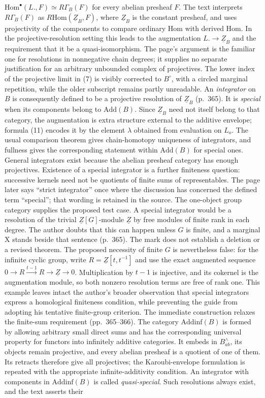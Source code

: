 \documentclass[10pt,oneside]{book}
\begin{document}
$\mathrm{Hom}^{\bullet}(L.,F)\simeq R\Gamma_B(F)$ for every abelian presheaf $F$. The text interprets $R\Gamma_B(F)$ as $R\mathrm{Hom}(\underline Z_B,F)$, where $\underline Z_B$ is the constant presheaf, and uses projectivity of the components to compare ordinary Hom with derived Hom. In the projective-resolution setting this leads to the augmentation $L.\to\underline Z_B$ and the requirement that it be a quasi-isomorphism. The page's argument is the familiar one for resolutions in nonnegative chain degrees; it supplies no separate justification for an arbitrary unbounded complex of projectives. The lower index of the projective limit in (7) is visibly corrected to $B^{\circ}$, with a circled marginal repetition, while the older subscript remains partly unreadable. An \emph{integrator} on $B$ is consequently defined to be a projective resolution of $\underline Z_B$ (p.~365). It is \emph{special} when its components belong to $\mathrm{Add}(B)$. Since $\underline Z_B$ need not itself belong to that category, the augmentation is extra structure external to the additive envelope; formula (11) encodes it by the element $\lambda$ obtained from evaluation on $L_o$. The usual comparison theorem gives chain-homotopy uniqueness of integrators, and fullness gives the corresponding statement within $\mathrm{Add}(B)$ for special ones. General integrators exist because the abelian presheaf category has enough projectives. Existence of a special integrator is a further finiteness question: successive kernels need not be quotients of finite sums of representables. The page later says ``strict integrator'' once where the discussion has concerned the defined term ``special''; that wording is retained in the source. The one-object group category supplies the proposed test case. A special integrator would be a resolution of the trivial $\underline Z[G]$-module $\underline Z$ by free modules of finite rank in each degree. The author doubts that this can happen unless $G$ is finite, and a marginal X stands beside that sentence (p.~365). The mark does not establish a deletion or a revised theorem. The proposed necessity of finite $G$ is nevertheless false: for the infinite cyclic group, write $R=\underline Z[t,t^{-1}]$ and use the exact augmented sequence $0\to R\xrightarrow{t-1}R\to\underline Z\to0$. Multiplication by $t-1$ is injective, and its cokernel is the augmentation module, so both nonzero resolution terms are free of rank one. This example leaves intact the author's broader observation that special integrators express a homological finiteness condition, while preventing the guide from adopting his tentative finite-group criterion. The immediate construction relaxes the finite-sum requirement (pp.~365--366). The category $\mathrm{Addinf}(B)$ is formed by allowing arbitrary small direct sums and has the corresponding universal property for functors into infinitely additive categories. It embeds in $B^{\wedge}_{ab}$, its objects remain projective, and every abelian presheaf is a quotient of one of them. Its retracts therefore give all projectives; the Karoubi-envelope formulation is repeated with the appropriate infinite-additivity condition. An integrator with components in $\mathrm{Addinf}(B)$ is called \emph{quasi-special}. Such resolutions always exist, and the text asserts their 
\end{document}
